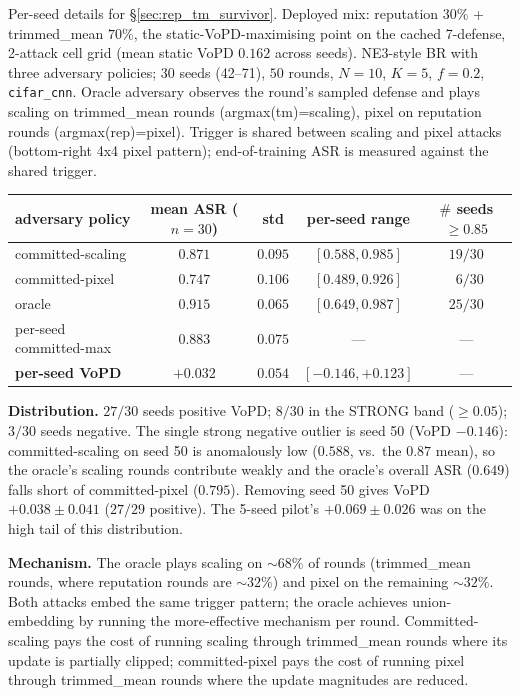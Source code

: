 \documentclass{article}
\begin{document}
Per-seed details for §\ref{sec:rep_tm_survivor}. Deployed mix: reputation $30\%$ + trimmed\_mean $70\%$, the static-VoPD-maximising point on the cached 7-defense, 2-attack cell grid (mean static VoPD $0.162$ across seeds). NE3-style BR with three adversary policies; $30$ seeds (42--71), $50$ rounds, $N{=}10$, $K{=}5$, $f{=}0.2$, \texttt{cifar\_cnn}. Oracle adversary observes the round's sampled defense and plays scaling on trimmed\_mean rounds (argmax(tm)=scaling), pixel on reputation rounds (argmax(rep)=pixel). Trigger is shared between scaling and pixel attacks (bottom-right 4x4 pixel pattern); end-of-training ASR is measured against the shared trigger.

\begin{center}\small
\begin{tabular}{l|cccc}
\toprule
adversary policy & mean ASR ($n=30$) & std & per-seed range & $\#$ seeds $\geq 0.85$ \\
\midrule
committed-scaling & $0.871$ & $0.095$ & $[0.588, 0.985]$ & $19/30$ \\
committed-pixel   & $0.747$ & $0.106$ & $[0.489, 0.926]$ & $\phantom{1}6/30$ \\
oracle            & $\mathbf{0.915}$ & $0.065$ & $[0.649, 0.987]$ & $25/30$ \\
\midrule
per-seed committed-max & $0.883$ & $0.075$ & --- & --- \\
\textbf{per-seed VoPD} & $\mathbf{+0.032}$ & $0.054$ & $[-0.146, +0.123]$ & --- \\
\bottomrule
\end{tabular}
\end{center}

\textbf{Distribution.} $27/30$ seeds positive VoPD; $8/30$ in the STRONG band ($\geq 0.05$); $3/30$ seeds negative. The single strong negative outlier is seed 50 (VoPD $-0.146$): committed-scaling on seed 50 is anomalously low ($0.588$, vs.\ the $0.87$ mean), so the oracle's scaling rounds contribute weakly and the oracle's overall ASR ($0.649$) falls short of committed-pixel ($0.795$). Removing seed 50 gives VoPD $+0.038 \pm 0.041$ ($27/29$ positive). The 5-seed pilot's $+0.069 \pm 0.026$ was on the high tail of this distribution.

\textbf{Mechanism.} The oracle plays scaling on $\sim 68\%$ of rounds (trimmed\_mean rounds, where reputation rounds are $\sim 32\%$) and pixel on the remaining $\sim 32\%$. Both attacks embed the same trigger pattern; the oracle achieves union-embedding by running the more-effective mechanism per round. Committed-scaling pays the cost of running scaling through trimmed\_mean rounds where its update is partially clipped; committed-pixel pays the cost of running pixel through trimmed\_mean rounds where the update magnitudes are reduced.
\end{document}

